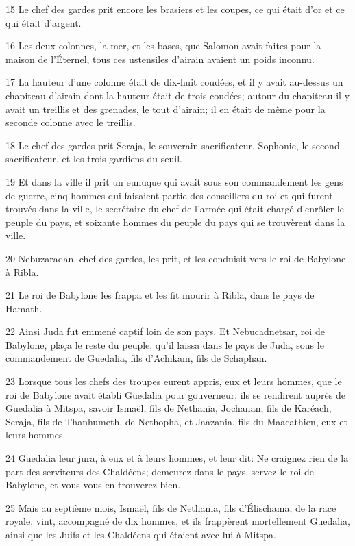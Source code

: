 \par 15 Le chef des gardes prit encore les brasiers et les coupes, ce qui était d'or et ce qui était d'argent.
\par 16 Les deux colonnes, la mer, et les bases, que Salomon avait faites pour la maison de l'Éternel, tous ces ustensiles d'airain avaient un poids inconnu.
\par 17 La hauteur d'une colonne était de dix-huit coudées, et il y avait au-dessus un chapiteau d'airain dont la hauteur était de trois coudées; autour du chapiteau il y avait un treillis et des grenades, le tout d'airain; il en était de même pour la seconde colonne avec le treillis.
\par 18 Le chef des gardes prit Seraja, le souverain sacrificateur, Sophonie, le second sacrificateur, et les trois gardiens du seuil.
\par 19 Et dans la ville il prit un eunuque qui avait sous son commandement les gens de guerre, cinq hommes qui faisaient partie des conseillers du roi et qui furent trouvés dans la ville, le secrétaire du chef de l'armée qui était chargé d'enrôler le peuple du pays, et soixante hommes du peuple du pays qui se trouvèrent dans la ville.
\par 20 Nebuzaradan, chef des gardes, les prit, et les conduisit vers le roi de Babylone à Ribla.
\par 21 Le roi de Babylone les frappa et les fit mourir à Ribla, dans le pays de Hamath.
\par 22 Ainsi Juda fut emmené captif loin de son pays. Et Nebucadnetsar, roi de Babylone, plaça le reste du peuple, qu'il laissa dans le pays de Juda, sous le commandement de Guedalia, fils d'Achikam, fils de Schaphan.
\par 23 Lorsque tous les chefs des troupes eurent appris, eux et leurs hommes, que le roi de Babylone avait établi Guedalia pour gouverneur, ils se rendirent auprès de Guedalia à Mitspa, savoir Ismaël, fils de Nethania, Jochanan, fils de Karéach, Seraja, fils de Thanhumeth, de Nethopha, et Jaazania, fils du Maacathien, eux et leurs hommes.
\par 24 Guedalia leur jura, à eux et à leurs hommes, et leur dit: Ne craignez rien de la part des serviteurs des Chaldéens; demeurez dans le pays, servez le roi de Babylone, et vous vous en trouverez bien.
\par 25 Mais au septième mois, Ismaël, fils de Nethania, fils d'Élischama, de la race royale, vint, accompagné de dix hommes, et ils frappèrent mortellement Guedalia, ainsi que les Juifs et les Chaldéens qui étaient avec lui à Mitspa.
